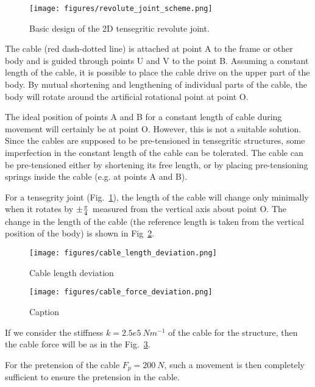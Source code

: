 \documentclass{article}
\begin{document}
\begin{figure}[!h]
    \centering
    \texttt{[image: figures/revolute\_joint\_scheme.png]}
    \caption{Basic design of the 2D tensegritic revolute joint.}
    \label{fig:2D_revolute_constant_cable}
\end{figure}

The cable (red dash-dotted line) is attached at point A to the frame or other body and is guided through points U and V to the point B. Assuming a constant length of the cable, it is possible to place the cable drive on the upper part of the body.  By mutual shortening and lengthening of individual parts of the cable, the body will rotate around the artificial rotational point at point O.

The ideal position of points A and B for a constant length of cable during movement will certainly be at point O. However, this is not a suitable solution. Since the cables are supposed to be pre-tensioned in tensegritic structures, some imperfection in the constant length of the cable can be tolerated.  The cable can be pre-tensioned either by shortening its free length, or by placing pre-tensioning springs inside the cable (e.g. at points A and B).

For a tensegrity joint (Fig.~\ref{fig:2D_revolute_constant_cable}), the length of the cable will change only minimally when it rotates by $\pm{\pi \over 4}$ measured from the vertical axis about point O. The change in the length of the cable (the reference length is taken from the vertical position of the body) is shown in Fig~\ref{fig:cable_length_deviatiopn}.

\begin{figure}[h]
    \centering
    \texttt{[image: figures/cable\_length\_deviation.png]}
    \caption{Cable length deviation}
    \label{fig:cable_length_deviatiopn}
\end{figure}

\begin{figure}[h]
    \centering
    \texttt{[image: figures/cable\_force\_deviation.png]}
    \caption{Caption}
    \label{fig:cable_force_deviation}
\end{figure}

If we consider the stiffness $k=2.5e5\ Nm^{-1}$ of the cable for the structure, then the cable force will be as in the Fig.~\ref{fig:cable_force_deviation}.

For the pretension of the cable $F_p=200\ N$, such a movement is then completely sufficient to ensure the pretension in the cable.
\end{document}
